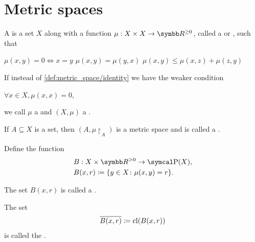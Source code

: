\section{Metric spaces}\label{sec:metric_spaces}

\begin{definition}\label{def:metric_space}\cite[248]{Engelking1989}
  A  is a set \( X \) along with a function \( \mu: X \times X \to \BB{R}^{\geq 0} \), called a  or , such that
  \begin{description}
     \( \mu(x, y) = 0 \iff x = y \)
     \( \mu(x, y) = \mu(y, x) \)
     \( \mu(x, y) \leq \mu(x, z) + \mu(z, y) \)
  \end{description}

  If instead of \ref{def:metric_space/identity} we have the weaker condition
  \begin{description}
     \( \forall x \in X, \mu(x, x) = 0 \),
  \end{description}
  we call \( \mu \) a  and \( (X, \mu) \) a .

  \begin{defenum}
    \item\label{def:metric_space/subspace} If \( A \subseteq X \) is a set, then \( (A, \mu{\restriction_A}) \) is a metric space and is called a .

    \item\label{def:metric_space/ball} Define the function
    \begin{align*}
      &B: X \times \BB{R}^{>0} \to \Power(X), \\
      &B(x, r) \coloneqq \{ y \in X \colon \mu(x, y) = r \}.
    \end{align*}

    The set \( B(x, r) \) is called a .

    \item\label{def:metric_space/closed_ball} The set
    \begin{align*}
      \overline{B(x, r)} \coloneqq \operatorname{cl}(B(x, r))
    \end{align*}
    is called the .


\end{defenum}
\end{definition}
